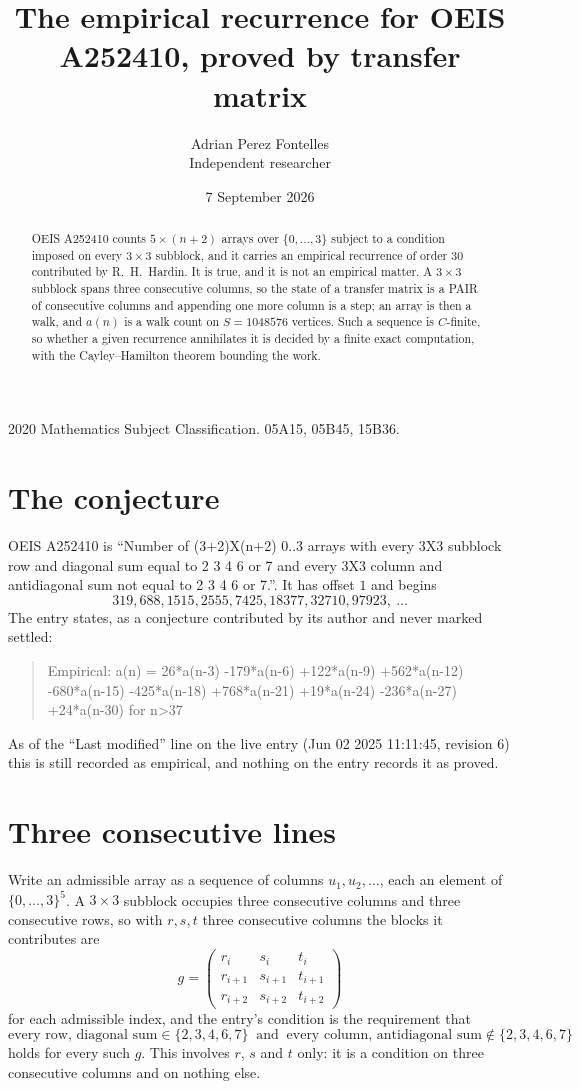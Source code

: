 \documentclass[11pt,a4paper]{article}
\title{The empirical recurrence for OEIS A252410, proved by transfer matrix}
\author{Adrian Perez Fontelles\\ \small Independent researcher}
\date{7 September 2026}
\theoremstyle{plain}
\theoremstyle{definition}
\begin{document}
\maketitle

\begin{abstract}
OEIS A252410 counts $5\times(n+2)$ arrays over $\{0,\dots,3\}$ subject to a condition imposed on
every $3\times3$ subblock, and it carries an empirical recurrence of order $30$
contributed by R.~H.~Hardin. It is true, and it is not an empirical matter. A $3\times3$
subblock spans three consecutive columns, so the state of a transfer matrix is a PAIR of
consecutive columns and appending one more column is a step; an array is then a walk, and
$a(n)$ is a walk count on $S=1048576$ vertices. Such a sequence is $C$-finite, so whether a given
recurrence annihilates it is decided by a finite exact computation, with the Cayley--Hamilton
theorem bounding the work.
\end{abstract}

\noindent\small 2020 Mathematics Subject Classification. 05A15, 05B45, 15B36.\normalsize

\section{The conjecture}

OEIS A252410 is ``Number of (3+2)X(n+2) 0..3 arrays with every 3X3 subblock row and diagonal sum equal to 2 3 4 6 or 7 and every 3X3 column and antidiagonal sum not equal to 2 3 4 6 or 7.''. It has offset $1$ and begins
\[
319, 688, 1515, 2555, 7425, 18377, 32710, 97923,\ \dots
\]
The entry states, as a conjecture contributed by its author and never marked settled:
\begin{quote}
Empirical: a(n) = 26*a(n-3) -179*a(n-6) +122*a(n-9) +562*a(n-12) -680*a(n-15) -425*a(n-18) +768*a(n-21) +19*a(n-24) -236*a(n-27) +24*a(n-30) for n>37
\end{quote}
As of the ``Last modified'' line on the live entry (Jun 02 2025 11:11:45, revision 6) this is still
recorded as empirical, and nothing on the entry records it as proved.

\section{Three consecutive lines}

Write an admissible array as a sequence of columns $u_1,u_2,\dots$, each an element of
$\{0,\dots,3\}^{5}$. A $3\times3$ subblock occupies three consecutive columns and
three consecutive rows, so with $r,s,t$ three consecutive columns the blocks it
contributes are
\[
g=\begin{pmatrix}r_i&s_i&t_i\\ r_{i+1}&s_{i+1}&t_{i+1}\\ r_{i+2}&s_{i+2}&t_{i+2}\end{pmatrix}
\]
for each admissible index, and the entry's condition is the requirement that
\[
\text{every row, diagonal sum} \in \{2,3,4,6,7\}\ \text{ and }\ \text{every column, antidiagonal sum} \notin \{2,3,4,6,7\}
\]
holds for every such $g$. This involves $r$, $s$ and $t$ only: it is a condition on
three consecutive columns and on nothing else.
\end{document}
